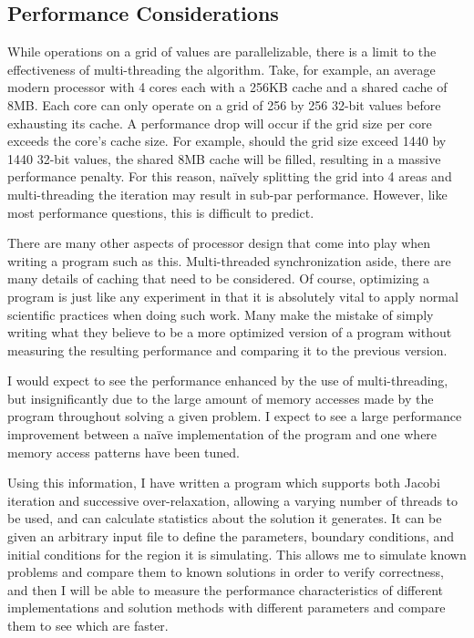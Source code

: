 \subsection{Performance Considerations}
While operations on a grid of values are parallelizable, there is a limit to
the effectiveness of multi-threading the algorithm. Take, for example, an average
modern processor with 4 cores each with a 256KB cache and a shared cache of 8MB\@. Each core
can only operate on a grid of 256 by 256 32-bit values before exhausting its cache.
A performance drop will occur if the grid size per core exceeds the core's cache
size. For example, should the grid size exceed 1440 by 1440 32-bit values,
the shared 8MB cache will
be filled, resulting in a massive performance penalty. For this reason, na\"{i}vely splitting
the grid into 4 areas and multi-threading the iteration may result in sub-par performance.
However, like most performance questions, this is difficult to predict.

There are many other aspects of processor design that come into play when writing a program
such as this. Multi-threaded synchronization aside, there are many details of caching that
need to be considered. Of course, optimizing a program is just like any experiment in that
it is absolutely vital to apply normal scientific practices when doing such work. Many make
the mistake of simply writing what they believe to be a more optimized version of a program
without measuring the resulting performance and comparing it to the previous version.

I would expect to see the performance enhanced by the use of multi-threading, but insignificantly
due to the large amount of memory accesses made by the program throughout solving a given problem.
I expect to see a large performance improvement between a na\"{i}ve implementation of the program
and one where memory access patterns have been tuned.


\vspace{10mm}

Using this information, I have written a program which supports both Jacobi iteration and successive over-relaxation,
allowing a varying number of threads to be used, and can calculate statistics about the solution it generates.
It can be given an arbitrary input file to define the parameters, boundary conditions, and initial conditions for
the region it is simulating. This allows me to simulate known problems and compare them to known solutions in order
to verify correctness, and then I will be able
to measure the performance characteristics of different implementations and solution methods with different parameters
and compare them to see which are faster.
